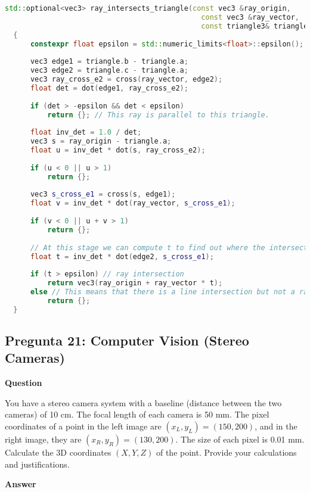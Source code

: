\documentclass{article}
\begin{document}
\begin{lstlisting}[language=C++, caption={Intersección de rayos con triángulos}]
  std::optional<vec3> ray_intersects_triangle(const vec3 &ray_origin,
                                              const vec3 &ray_vector,
                                              const triangle3& triangle)
  {
      constexpr float epsilon = std::numeric_limits<float>::epsilon();
  
      vec3 edge1 = triangle.b - triangle.a;
      vec3 edge2 = triangle.c - triangle.a;
      vec3 ray_cross_e2 = cross(ray_vector, edge2);
      float det = dot(edge1, ray_cross_e2);
  
      if (det > -epsilon && det < epsilon)
          return {}; // This ray is parallel to this triangle.
  
      float inv_det = 1.0 / det;
      vec3 s = ray_origin - triangle.a;
      float u = inv_det * dot(s, ray_cross_e2);
  
      if (u < 0 || u > 1)
          return {};
  
      vec3 s_cross_e1 = cross(s, edge1);
      float v = inv_det * dot(ray_vector, s_cross_e1);
  
      if (v < 0 || u + v > 1)
          return {};
  
      // At this stage we can compute t to find out where the intersection point is on the line.
      float t = inv_det * dot(edge2, s_cross_e1);
  
      if (t > epsilon) // ray intersection
          return vec3(ray_origin + ray_vector * t);
      else // This means that there is a line intersection but not a ray intersection.
          return {};
  }
\end{lstlisting}  

\subsection{Pregunta 21: Computer Vision (Stereo Cameras)}

\textbf{Question}

You have a stereo camera system with a baseline (distance between the two cameras) of 10 cm. The focal length of each camera is 50 mm. The pixel coordinates of a point in the left image are $(x_L, y_L) = (150, 200)$, and in the right image, they are $(x_R, y_R) = (130, 200)$. The size of each pixel is 0.01 mm. Calculate the 3D coordinates $(X, Y, Z)$ of the point. Provide your calculations and justifications.

\textbf{Answer}
\end{document}
